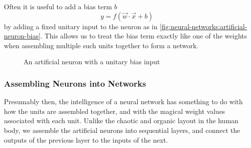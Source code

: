 Often it is useful to add a bias term $b$
\begin{equation}
    y = f(\vec w \cdot \vec x + b) \label{eq:neural-networks:ffnn-unit}
\end{equation}
by adding a fixed unitary input to the neuron as in \autoref{fig:neural-networks:artificial-neuron-bias}.
This allows us to treat the bias term exactly like one of the weights when assembling multiple such units together to form a network.
\begin{figure}[h]
    \centering
    \caption{An artificial neuron with a unitary bias input}\label{fig:neural-networks:artificial-neuron-bias}
\end{figure}

\subsubsection{Assembling Neurons into Networks}\label{sec:neural-networks:assembling-neurons}

Presumably then, the intelligence of a neural network has something to do with how the units are assembled together, and with the magical weight values associated with each unit.
Unlike the chaotic and organic layout in the human body, we assemble the artificial neurons into sequential layers, and connect the outputs of the previous layer to the inputs of the next.

